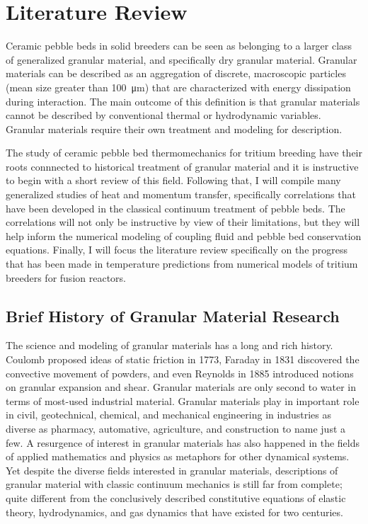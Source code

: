 \chapter{Literature Review}

Ceramic pebble beds in solid breeders can be seen as belonging to a larger class of generalized granular material, and specifically dry granular material. Granular materials can be described as an aggregation of discrete, macroscopic particles (mean size greater than \SI{100}{\micro\meter}) that are characterized with energy dissipation during interaction. \cite{duran2012sands} The main outcome of this definition is that granular materials cannot be described by conventional thermal or hydrodynamic variables. Granular materials require their own treatment and modeling for description.

The study of ceramic pebble bed thermomechanics for tritium breeding have their roots connnected to historical treatment of granular material and it is instructive to begin with a short review of this field. Following that, I will compile many generalized studies of heat and momentum transfer, specifically correlations that have been developed in the classical continuum treatment of pebble beds. The correlations will not only be instructive by view of their limitations, but they will help inform the numerical modeling of coupling fluid and pebble bed conservation equations. Finally, I will focus the literature review specifically on the progress that has been made in temperature predictions from numerical models of tritium breeders for fusion reactors.

\section{Brief History of Granular Material Research}
The science and modeling of granular materials has a long and rich history. Coulomb proposed ideas of static friction in 1773, Faraday in 1831 discovered the convective movement of powders, and even Reynolds in 1885 introduced notions on granular expansion and shear.\cite{Jaeger1996a} Granular materials are only second to water in terms of most-used industrial material. Granular materials play in important role in civil, geotechnical, chemical, and mechanical engineering in industries as diverse as pharmacy, automative, agriculture, and construction to name just a few.\cite{Hill,duran2012sands} A resurgence of interest in granular materials has also happened in the fields of applied mathematics and physics as metaphors for other dynamical systems.\cite{Jaeger1996a} Yet despite the diverse fields interested in granular materials, descriptions of granular material with classic continuum mechanics is still far from complete; quite different from the conclusively described constitutive equations of elastic theory, hydrodynamics, and gas dynamics that have existed for two centuries.\cite{Sadovskaya2012} 

